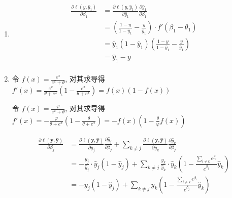 \documentclass[answers]{exam}  %
\begin{document}
\begin{questions}
\begin{enumerate}
  \end{enumerate}


  \begin{solution}
    \begin{enumerate}
      \item

            $$
              \begin{aligned}
                \frac{\partial \ell(y, \hat{y}_1)}{\partial \beta_1}
                 & = \frac{\partial \ell(y, \hat{y}_1)}{\partial \hat{y}_1}\frac{\partial \hat{y}_1}{\partial \beta_1} \\
                 & = (\frac{1-y}{1-\hat{y}_1} - \frac{y}{\hat{y}_1}) \cdot f'(\beta_1 - \theta_1)                      \\
                 & = \hat{y}_1(1-\hat{y}_1)(\frac{1-y}{1-\hat{y}_1} - \frac{y}{\hat{y}_1})                             \\
                 & = \hat{y}_1 - y                                                                                     \\
              \end{aligned}
            $$

      \item

            令 $\displaystyle f(x) = \frac{e^{x}}{e^{x} + \theta}$, 对其求导得 $\displaystyle f'(x) = \frac{e^{x}}{\theta + e^{x}}(1 - \frac{e^{x}}{\theta + e^{x}}) = f(x)(1-f(x))$

            令 $\displaystyle f(x) = \frac{\varphi}{e^{x} + \theta}$, 对其求导得 $\displaystyle f'(x) = - \frac{\varphi}{\theta + e^{x}}(1 - \frac{\theta}{\theta + e^{x}}) = -f(x)(1 - \frac{\theta}{\varphi}f(x))$

            $$
              \begin{aligned}
                \frac{\partial \ell(\bm{y}, \hat{\bm{y}})}{\partial \beta_j}
                 & = \frac{\partial \ell(\bm{y}, \hat{\bm{y}})}{\partial \hat{y}_j}\frac{\partial \hat{y}_j}{\partial \beta_j} + \sum_{k \neq j}\frac{\partial \ell(\bm{y}, \hat{\bm{y}})}{\partial \hat{y}_k}\frac{\partial \hat{y}_k}{\partial \beta_j} \\
                 & = -\frac{y_j}{\hat{y}_j} \cdot \hat{y}_j(1 - \hat{y}_j) + \sum_{k \neq j} \frac{y_k}{\hat{y}_k} \cdot \hat{y}_k(1 - \frac{\sum_{i \neq k}e^{\beta_i}}{e^{\beta_j}}\hat{y}_k)                                                           \\
                 & = -y_{j} (1 - \hat{y}_j) + \sum_{k \neq j} y_{k}(1 - \frac{\sum_{i \neq k}e^{\beta_i}}{e^{\beta_j}}\hat{y}_k)                                                                                                                          \\
              \end{aligned}
            $$


\end{enumerate}
\end{solution}
\end{questions}
\end{document}
